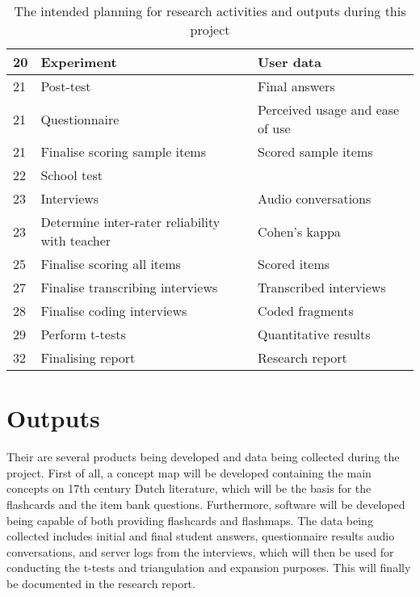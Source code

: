 \begin{table}
\begin{tabular}{ l | p{} | p{}}
        20 & Experiment & User data \\ \hline
        21 & Post-test & Final answers \\ \hline
        21 & Questionnaire & Perceived usage and ease of use \\ \hline
        21 & Finalise scoring sample items & Scored sample items \\ \hline
        22 & School test & \\ \hline
        23 & Interviews & Audio conversations \\ \hline
        23 & Determine inter-rater reliability with teacher & Cohen's kappa \\ \hline
        25 & Finalise scoring all items & Scored items \\ \hline
        27 & Finalise transcribing interviews & Transcribed interviews \\ \hline
        28 & Finalise coding interviews & Coded fragments \\ \hline
        29 & Perform t-tests & Quantitative results \\ \hline
        32 & Finalising report & Research report \\
    \end{tabular}
    \caption{The intended planning for research activities and outputs during this project \label{tab:planning}}
\end{table}

\section{Outputs}


Their are several products being developed and data being collected during the project. First of all, a concept map will be developed containing the main concepts on 17th century Dutch literature, which will be the basis for the flashcards and the item bank questions. Furthermore, software will be developed being capable of both providing flashcards and flashmaps. The data being collected includes initial and final student answers, questionnaire results audio conversations, and server logs from the interviews, which will then be used for conducting the t-tests and triangulation and expansion purposes. This will finally be documented in the research report.
